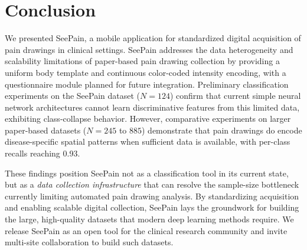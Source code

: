 \documentclass[conference]{IEEEtran}
\begin{document}
\section{Conclusion}
\label{sec:conclusion}

We presented SeePain, a mobile application for standardized digital acquisition of pain drawings in clinical settings. SeePain addresses the data heterogeneity and scalability limitations of paper-based pain drawing collection by providing a uniform body template and continuous color-coded intensity encoding, with a questionnaire module planned for future integration. Preliminary classification experiments on the SeePain dataset ($N=124$) confirm that current simple neural network architectures cannot learn discriminative features from this limited data, exhibiting class-collapse behavior. However, comparative experiments on larger paper-based datasets ($N=245$ to $885$) demonstrate that pain drawings do encode disease-specific spatial patterns when sufficient data is available, with per-class recalls reaching 0.93.

These findings position SeePain not as a classification tool in its current state, but as a \emph{data collection infrastructure} that can resolve the sample-size bottleneck currently limiting automated pain drawing analysis. By standardizing acquisition and enabling scalable digital collection, SeePain lays the groundwork for building the large, high-quality datasets that modern deep learning methods require. We release SeePain as an open tool for the clinical research community and invite multi-site collaboration to build such datasets.


% 
\end{document}
